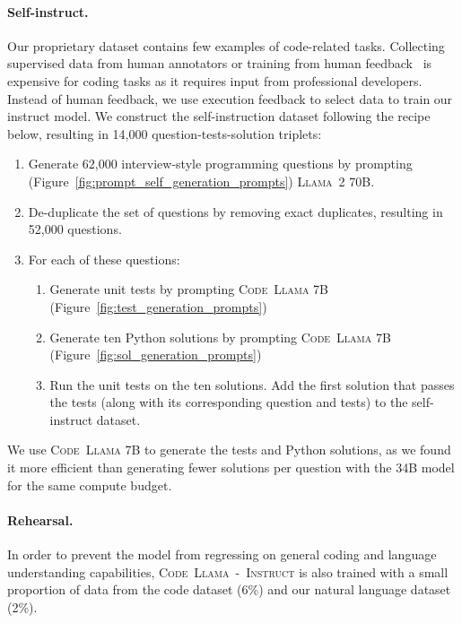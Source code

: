 \documentclass[10pt]{article}
\newcommand{\model}{\textsc{Code~Llama}\xspace}
\newcommand{\instmodel}{\textsc{Code~Llama~-~Instruct}\xspace}
\newcommand{\llamavtwo}{\textsc{Llama~2}\xspace}
\begin{document}
\paragraph{Self-instruct.}
Our proprietary dataset contains few examples of code-related tasks. 
Collecting supervised data from human annotators or training from human feedback~\citep{ouyang2022training} is expensive for coding tasks as it requires input from professional developers. 
Instead of human feedback, we use execution feedback to select data to train our instruct model. We construct the self-instruction dataset following the recipe below, resulting in 14,000 question-tests-solution triplets:

\begin{enumerate}
 \item Generate 62,000 interview-style programming questions by prompting (Figure~\ref{fig:prompt_self_generation_prompts}) \llamavtwo70B.
 \item De-duplicate the set of questions by removing exact duplicates, resulting in 52,000 questions.
 \item For each of these questions:
 \begin{enumerate}
    \item Generate unit tests by prompting \model7B (Figure~\ref{fig:test_generation_prompts})
    \item Generate ten Python solutions by prompting \model7B (Figure~\ref{fig:sol_generation_prompts})
    \item Run the unit tests on the ten solutions. Add the first solution that passes the tests (along with its corresponding question and tests) to the self-instruct dataset.
 \end{enumerate}
\end{enumerate}

We use \model 7B to generate the tests and Python solutions, as we found it more efficient than generating fewer solutions per question with the 34B model for the same compute budget. 

\paragraph{Rehearsal.}
In order to prevent the model from regressing on general coding and language understanding capabilities, \instmodel is also trained with a small proportion of data from the code dataset (6\%) and our natural language dataset (2\%). 
\end{document}
